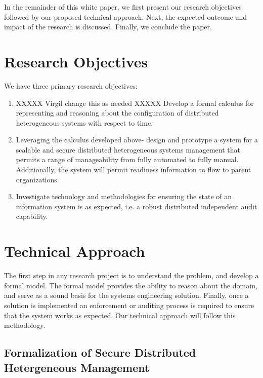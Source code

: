 \documentclass[10pt]{article}
\begin{document}
In the remainder of this white paper, we first present our research
objectives followed by our proposed technical approach. Next, the
expected outcome and impact of the research is discussed. Finally, we
conclude the paper.

\section{Research Objectives}

We have three primary research objectives:
\begin{enumerate}

\item XXXXX Virgil change this as needed XXXXX Develop a formal
calculus for representing and reasoning about the configuration of
distributed heterogeneous systems with respect to time.

\item Leveraging the calculus developed above- design and prototype a
system for a scalable and secure distributed heterogeneous systems
management that permits a range of manageability from fully automated
to fully manual. Additionally, the system will permit readiness
information to flow to parent organizations.

\item Investigate technology and methodologies for ensuring the state
of an information system is as expected, i.e. a robust distributed
independent audit capability.

\end{enumerate}

\section{Technical Approach}

The first step in any research project is to understand the problem,
and develop a formal model. The formal model provides the ability to
reason about the domain, and serve as a sound basis for the systems
engineering solution. Finally, once a solution is implemented an
enforcement or auditing process is required to ensure that the system
works as expected. Our technical approach will follow this
methodology. 

\subsection{Formalization of Secure Distributed Hetergeneous Management}

\end{document}

